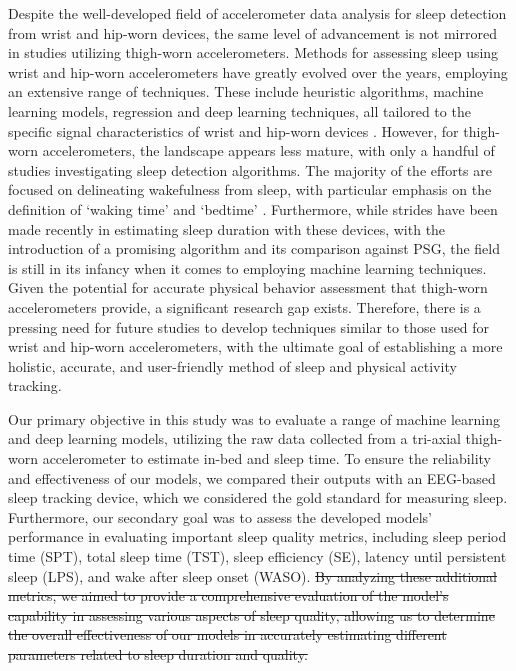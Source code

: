\documentclass[
  super,
  preprint,
  3p]{elsarticle}
\begin{document}
Despite the well-developed field of accelerometer data analysis for
sleep detection from wrist and hip-worn devices, the same level of
advancement is not mirrored in studies utilizing thigh-worn
accelerometers. Methods for assessing sleep using wrist and hip-worn
accelerometers have greatly evolved over the years, employing an
extensive range of techniques. These include heuristic algorithms,
machine learning models, regression and deep learning techniques, all
tailored to the specific signal characteristics of wrist and hip-worn
devices
\citep{palotti2019, cole1992, sazonov2004, sadeh1994, hees2015, sundararajan2021, patterson_40_2023}.
However, for thigh-worn accelerometers, the landscape appears less
mature, with only a handful of studies investigating sleep detection
algorithms. The majority of the efforts are focused on delineating
wakefulness from sleep, with particular emphasis on the definition of
`waking time' and `bedtime'
\citep{carlson2021, inan-eroglu2021, vanderberg2016, winkler2016}.
Furthermore, while strides have been made recently in estimating sleep
duration with these devices, with the introduction of a promising
algorithm and its comparison against
PSG\citep{johansson_development_2023}, the field is still in its infancy
when it comes to employing machine learning techniques. Given the
potential for accurate physical behavior assessment that thigh-worn
accelerometers provide\citep{skotte_detection_2014, arvidsson2019}, a
significant research gap exists. Therefore, there is a pressing need for
future studies to develop techniques similar to those used for wrist and
hip-worn accelerometers, with the ultimate goal of establishing a more
holistic, accurate, and user-friendly method of sleep and physical
activity tracking.

Our primary objective in this study was to evaluate a range of machine
learning and deep learning models, utilizing the raw data collected from
a tri-axial thigh-worn accelerometer to estimate in-bed and sleep time.
To ensure the reliability and effectiveness of our models, we compared
their outputs with an EEG-based sleep tracking device, which we
considered the gold standard for measuring sleep. Furthermore, our
secondary goal was to assess the developed models' performance in
evaluating important sleep quality metrics, including sleep period time
(SPT), total sleep time (TST), sleep efficiency (SE), latency until
persistent sleep (LPS), and wake after sleep onset (WASO). \st{By
analyzing these additional metrics, we aimed to provide a comprehensive
evaluation of the model's capability in assessing various aspects of
sleep quality, allowing us to determine the overall effectiveness of our
models in accurately estimating different parameters related to sleep
duration and quality.}
\end{document}
